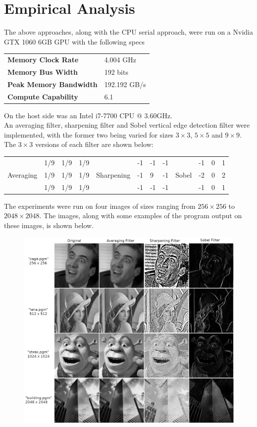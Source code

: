 \documentclass[10pt]{article}
\begin{document}
\section{Empirical Analysis}
The above approaches, along with the CPU serial approach, were run on a Nvidia GTX 1060 6GB GPU with the following specs
\begin{table}[H]
\begin{tabular}{ll}
\textbf{Memory Clock Rate}     & 4.004 GHz    \\
\textbf{Memory Bus Width}      & 192 bits     \\
\textbf{Peak Memory Bandwidth} & 192.192 GB/s \\
\textbf{Compute Capability}    & 6.1         
\end{tabular}
\end{table}
On the host side was an Intel i7-7700 CPU @ 3.60GHz. 
\\
An averaging filter, sharpening filter and Sobel vertical edge detection filter were implemented, with the former two being varied for sizes $3\times3$, $5\times5$ and $9\times9$. The $3\times3$ versions of each filter are shown below:
\begin{table}[H]
\begin{tabular}{l|l|l|l|c|l|l|l|l|l|l|l|}
\cline{2-4} \cline{6-8} \cline{10-12}
          & 1/9 & 1/9 & 1/9 &            & -1 & -1 & -1 &       & -1 & 0 & 1 \\ \cline{2-4} \cline{6-8} \cline{10-12} 
Averaging & 1/9 & 1/9 & 1/9 & Sharpening & -1 & 9  & -1 & Sobel & -2 & 0 & 2 \\ \cline{2-4} \cline{6-8} \cline{10-12} 
          & 1/9 & 1/9 & 1/9 &            & -1 & -1 & -1 &       & -1 & 0 & 1 \\ \cline{2-4} \cline{6-8} \cline{10-12} 
\end{tabular}
\end{table}
The experiments were run on four images of sizes ranging from $256 \times 256$ to $2048 \times 2048$. The images, along with some examples of the program output on these images, is shown below.
\begin{figure}[H]
\centering
\includegraphics[scale=1.2]{images.png}
\end{figure}
\end{document}
